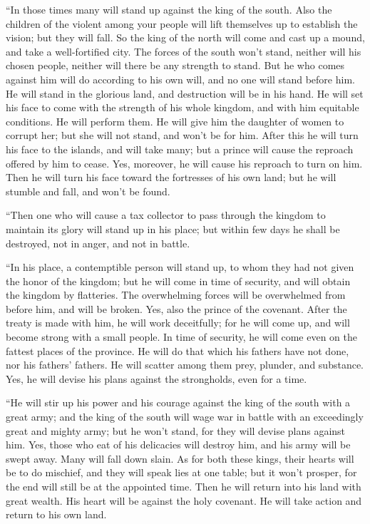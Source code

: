  ``In those times many will stand up against the king of
the south. Also the children of the violent among your people will lift
themselves up to establish the vision; but they will fall. 
So the king of the north will come and cast up a mound, and take a
well-fortified city. The forces of the south won't stand, neither will
his chosen people, neither will there be any strength to stand.
 But he who comes against him will do according to his own
will, and no one will stand before him. He will stand in the glorious
land, and destruction will be in his hand.  He will set his
face to come with the strength of his whole kingdom, and with him
equitable conditions. He will perform them. He will give him the
daughter of women to corrupt her; but she will not stand, and won't be
for him.  After this he will turn his face to the islands,
and will take many; but a prince will cause the reproach offered by him
to cease. Yes, moreover, he will cause his reproach to turn on him.
 Then he will turn his face toward the fortresses of his
own land; but he will stumble and fall, and won't be found.

 ``Then one who will cause a tax collector to pass through
the kingdom to maintain its glory will stand up in his place; but within
few days he shall be destroyed, not in anger, and not in battle.

 ``In his place, a contemptible person will stand up, to
whom they had not given the honor of the kingdom; but he will come in
time of security, and will obtain the kingdom by flatteries.
 The overwhelming forces will be overwhelmed from before
him, and will be broken. Yes, also the prince of the covenant.
 After the treaty is made with him, he will work
deceitfully; for he will come up, and will become strong with a small
people.  In time of security, he will come even on the
fattest places of the province. He will do that which his fathers have
not done, nor his fathers' fathers. He will scatter among them prey,
plunder, and substance. Yes, he will devise his plans against the
strongholds, even for a time.

 ``He will stir up his power and his courage against the
king of the south with a great army; and the king of the south will wage
war in battle with an exceedingly great and mighty army; but he won't
stand, for they will devise plans against him.  Yes, those
who eat of his delicacies will destroy him, and his army will be swept
away. Many will fall down slain.  As for both these kings,
their hearts will be to do mischief, and they will speak lies at one
table; but it won't prosper, for the end will still be at the appointed
time.  Then he will return into his land with great wealth.
His heart will be against the holy covenant. He will take action and
return to his own land.

